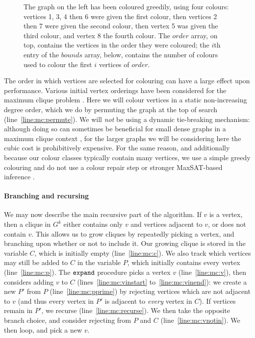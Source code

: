 \documentclass[letterpaper]{article}
\newcommand{\mcline}[1]{line~\ref{line:mc:#1}}
\newcommand{\mclinerange}[2]{lines~\ref{line:mc:#1} to~\ref{line:mc:#2}}
\newcommand{\bounds}{\mathit{bounds}}
\newcommand{\order}{\mathit{order}}
\newcommand{\expand}{\FuncSty{expand}}
\begin{document}
\begin{figure}[b]

    \caption{The graph on the left has been coloured greedily, using four
        colours: vertices 1, 3, 4 then 6 were given the first colour, then
        vertices 2 then 7 were given the second colour, then vertex 5 was given
        the third colour, and vertex 8 the fourth colour. The $\order$ array,
        on top, contains the vertices in the order they were coloured; the
        $i$th entry of the $\bounds$ array, below, contains the number of colours
        used to colour the first $i$ vertices of $\order$.}
    \label{figure:colours}
\end{figure}

The order in which vertices are selected for colouring can have a large effect upon performance.
Various initial vertex orderings have been considered for the maximum clique problem
\cite{Prosser:2012,DBLP:conf/lion/SegundoLB14}. Here we will colour vertices in a static
non-increasing degree order, which we do by permuting the graph at the top of search
(\mcline{permute}). We will \emph{not} be using a dynamic tie-breaking mechanism: although doing so
can sometimes be beneficial for small dense graphs in a maximum clique context \cite{Tomita:2010},
for the larger graphs we will be considering here the cubic cost is prohibitively expensive. For the
same reason, and additionally because our colour classes typically contain many vertices, we use a
simple greedy colouring and do not use a colour repair step \cite{Tomita:2010} or stronger
MaxSAT-based inference \cite{DBLP:journals/cor/SegundoNB15,DBLP:conf/lion/LiJX15}.

\paragraph{Branching and recursing}

We may now describe the main recursive part of the algorithm. If $v$ is a vertex, then a clique in
$G^k$ either contains only $v$ and vertices adjacent to $v$, or does not contain $v$. This allows us
to grow cliques by repeatedly picking a vertex, and branching upon whether or not to include it. Our
growing clique is stored in the variable $C$, which is initially empty (\mcline{c}). We also track
which vertices may still be added to $C$ in the variable $P$, which initially contains every vertex
(\mcline{p}). The $\expand$ procedure picks a vertex $v$ (\mcline{v}), then considers adding $v$ to
$C$ (\mclinerange{vinstart}{vinend}): we create a new $P'$ from $P$ (\mcline{pprime}) by
rejecting vertices which are not adjacent to $v$ (and thus every vertex in $P'$ is adjacent to
\emph{every} vertex in $C$). If vertices remain in $P'$, we recurse (\mcline{recurse}). We then take
the opposite branch choice, and consider rejecting from $P$ and $C$
(\mcline{vnotin}). We then loop, and pick a new $v$.
\end{document}
